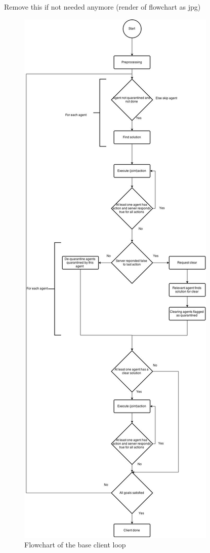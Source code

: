 \documentclass[letterpaper]{article}
\begin{document}



Remove this if not needed anymore (render of flowchart as jpg)

\begin{figure}[!htb]
\centering
\includegraphics[width=\linewidth]{clientflowchart.jpg}
\caption{Flowchart of the base client loop}
\label{fig:clientflowchart}
\end{figure}
\end{document}
